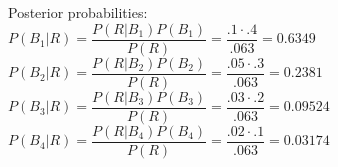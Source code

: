 \documentclass{article}
\begin{document}
\begin{enumerate}
	Posterior probabilities:\\
	$P(B_1|R) = \dfrac{P(R|B_1)P(B_1)}{P(R)} = \dfrac{.1\cdot.4}{.063} = 0.6349$\\
	$P(B_2|R) = \dfrac{P(R|B_2)P(B_2)}{P(R)} = \dfrac{.05\cdot.3}{.063} = 0.2381$\\
	$P(B_3|R) = \dfrac{P(R|B_3)P(B_3)}{P(R)} = \dfrac{.03\cdot.2}{.063} = 0.09524$\\
	$P(B_4|R) = \dfrac{P(R|B_4)P(B_4)}{P(R)} = \dfrac{.02\cdot.1}{.063} = 0.03174$
    \end{enumerate}
\end{document}
